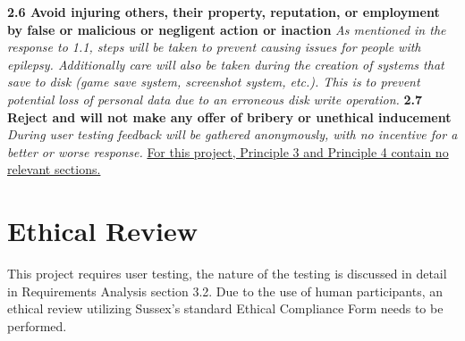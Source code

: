 \documentclass{report}
\begin{document}
\begin{raggedright}
\newline
\newline
\textbf{2.6 Avoid injuring others, their property, reputation, or employment by false or malicious or negligent action or inaction}
\newline
\newline
\textit{As mentioned in the response to 1.1, steps will be taken to prevent causing issues for people with epilepsy. Additionally care will also be taken during the creation of systems that save to disk (game save system, screenshot system, etc.). This is to prevent potential loss of personal data due to an erroneous disk write operation.}
\newline
\newline
\textbf{2.7 Reject and will not make any offer of bribery or unethical inducement}
\newline
\newline
\textit{During user testing feedback will be gathered anonymously, with no incentive for a better or worse response.}
\newline
\newline
\underline{For this project, Principle 3 and Principle 4 contain no relevant sections.}
\end{raggedright}

\section{Ethical Review}

This project requires user testing, the nature of the testing is discussed in detail in Requirements Analysis section 3.2.
Due to the use of human participants, an ethical review utilizing Sussex's standard Ethical Compliance Form needs to be performed.
\end{document}
